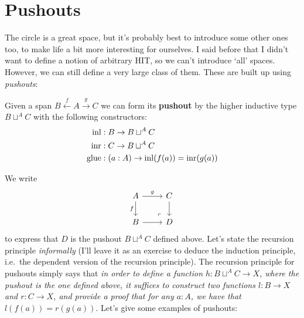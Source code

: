 \documentclass[10pt,oneside,leqno,openright]{memoir}
\begin{document}
\section*{Pushouts}

The circle is a great space, but it's probably best to introduce some other ones too, to make life a bit more interesting for ourselves.
%
I said before that I didn't want to define a notion of arbitrary HIT, so we can't introduce `all' spaces. However, we can still define a very large class of them. These are built up using \emph{pushouts}:
%
%
\begin{definition}
    Given a span $B \xleftarrow{f} A \xrightarrow{g} C$ we can form its \textbf{pushout} by the higher inductive type $B \sqcup^A C$ with the following constructors:
    \begin{align*}
        \operatorname{inl} &: B \to B \sqcup^A C \\
        \operatorname{inr} &: C \to B \sqcup^A C \\
        \operatorname{glue} &: (a : A) \to \operatorname{inl} (f (a)) = \operatorname{inr} (g (a))
    \end{align*}
\end{definition}
We write
\[\begin{tikzcd}[ampersand replacement=\&]
	A \& C \\
	B \& D
	\arrow["g", from=1-1, to=1-2]
	\arrow["f"', from=1-1, to=2-1]
	\arrow[from=1-2, to=2-2]
	\arrow[from=2-1, to=2-2]
	\arrow["\lrcorner"{anchor=center, pos=0.125, rotate=180}, draw=none, from=2-2, to=1-1]
\end{tikzcd}\]
to express that $D$ is the pushout $B \sqcup^A C$ defined above.
%
Let's state the recursion principle \emph{informally} (I'll leave it as an exercise to deduce the induction principle, i.e.\ the dependent version of the recursion principle).
%
The recursion principle for pushouts simply says that \textit{in order to define a function $h : B \sqcup^A C \to X$, where the pushout is the one defined above, it suffices to construct two functions $l : B \to X$ and $r : C \to X$, and provide a proof that for any $a :A$, we have that $l(f(a)) = r(g(a))$}. 
%
Let's give some examples of pushouts:
\end{document}
